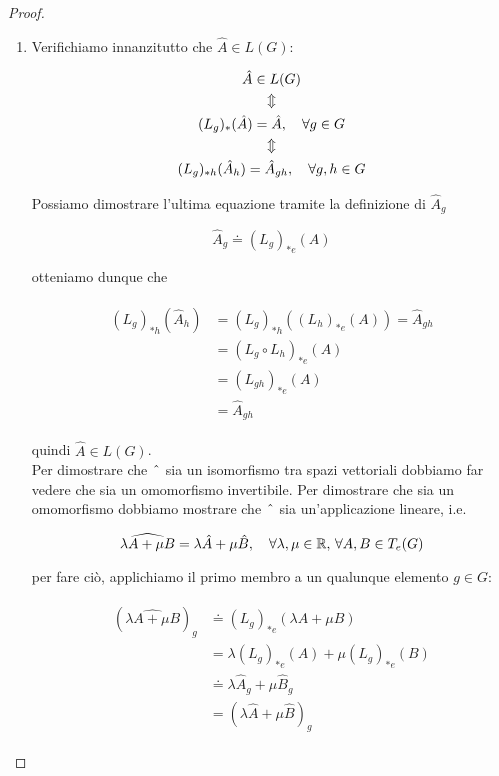 \begin{proof}
	\begin{enumerate}
		\item Verifichiamo innanzitutto che $ \hat{A} \in L(G) $:
		
		\begin{gather}
			\hat{A} \in L(G) \nonumber \\
			\Updownarrow \nonumber \\
			(L_{g})_{*}(\hat{A}) = \hat{A} \qcomma \forall g \in G \\
			\Updownarrow \nonumber \\
			(L_{g})_{*h}(\hat{A}_{h}) = \hat{A}_{gh} \qcomma \forall g,h \in G \nonumber
		\end{gather}
	
		Possiamo dimostrare l'ultima equazione tramite la definizione di $ \hat{A}_{g} $
		
		\begin{equation}
			\hat{A}_{g} \doteq (L_{g})_{*e}(A)
		\end{equation}
	
		otteniamo dunque che
		
		\begin{align}
			\begin{split}
				(L_{g})_{*h}(\hat{A}_{h}) &= (L_{g})_{*h}((L_{h})_{*e}(A)) = \hat{A}_{gh}\\
				&= (L_{g} \circ L_{h})_{*e} (A)\\
				&= (L_{gh})_{*e} (A)\\
				&= \hat{A}_{gh}
			\end{split}
		\end{align}
		
		quindi $ \hat{A} \in L(G) $.\\
		Per dimostrare che $ \; \hat{} \; $ sia un isomorfismo tra spazi vettoriali dobbiamo far vedere che sia un omomorfismo invertibile. Per dimostrare che sia un omomorfismo dobbiamo mostrare che $ \; \hat{} \; $ sia un'applicazione lineare, i.e.
		
		\begin{equation}
			\widehat{\lambda A + \mu B} = \lambda \hat{A} + \mu \hat{B} %
			 \qcomma \forall \lambda,\mu \in \R, \, \forall A,B \in T_{e}(G)
		\end{equation}
	
		per fare ciò, applichiamo il primo membro a un qualunque elemento $ g \in G $:
	
		\begin{align}
			\begin{split}
				(\widehat{\lambda A + \mu B})_{g} &\doteq (L_{g})_{*e} (\lambda A + \mu B) \\
				&= \lambda (L_{g})_{*e} (A) + \mu (L_{g})_{*e} (B) \\
				&\doteq \lambda \hat{A}_{g} + \mu \hat{B}_{g} \\
				&= (\lambda \hat{A} + \mu \hat{B})_{g}
			\end{split}
		\end{align}
	

\end{enumerate}
\end{proof}
